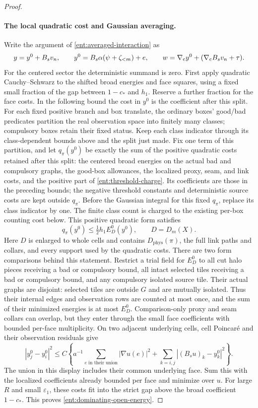 \begin{proof}
\paragraph{The local quadratic cost and Gaussian averaging.}
Write the argument of \eqref{ent:averaged-interaction} as
\[
 y=y^0+B_sv_n,\qquad
 y^0=B_s\alpha(\psi+\zeta_{<m})+e,\qquad
 w=\nabla_{\rm c}y^0+
                 (\nabla_{\rm c}B_sv_n+\tau).
\]
For the centered sector the deterministic summand is zero.
First apply quadratic Cauchy--Schwarz to the shifted broad energies
and face squares,
using a fixed small fraction of the gap between \(1-c_*\) and
\(h_1\).  Reserve a further fraction for the face costs.  In the
following bound the cost in \(y^0\) is the coefficient after this
split.
For each fixed positive branch and box translate, the ordinary boxes'
good/bad predicates partition the real observation space into finitely
many classes; compulsory boxes retain their fixed status.  Keep each
class indicator through its class-dependent bounds above and the split
just made.  Fix one term of this partition, and let \(q_\pi(y^0)\) be exactly the sum of the
positive quadratic costs retained after this split: the centered
broad energies on the actual bad and compulsory graphs, the
good-box allowances, the localized proxy, seam, and link costs, and
the positive part of \eqref{ent:threshold-charge}.  Its coefficients
are those in the preceding bounds; the negative threshold constants
and deterministic source costs are kept outside \(q_\pi\).  Before the
Gaussian integral for this fixed \(q_\pi\), replace its class indicator
by one.  The finite class count is charged to the existing per-box
counting cost below.  This positive quadratic form satisfies
\begin{equation}\label{ent:dominating-open-energy}
             q_\pi(y^0)\le\tfrac12 h_1 E_D^0(y^0),
                  \qquad D=D_m(X).
\end{equation}
Here \(D\) is enlarged to whole cells and contains
\(D_{\mathrm{phys}}(\pi)\), the full link paths and collars, and every
support used by the quadratic costs.  There are
two form comparisons behind this statement.  Restrict a
trial field for \(E_D^0\) to all cut halo pieces receiving a bad or
compulsory bound, all intact selected tiles receiving a bad or
compulsory bound, and any compulsory isolated source tile.
Their actual graphs are disjoint: selected tiles are outside \(G\)
and are mutually isolated.  Thus their internal edges and observation
rows are counted at most once, and the sum of their minimized
energies is at most \(E_D^0\).  Comparison-only proxy and seam collars
can overlap, but they enter through the small face coefficients with
bounded per-face multiplicity.  On two adjacent underlying
cells, cell Poincar\'e and their observation residuals give
\[
 |y_j^0-y_i^0|^2\le C\left\{
   a^{-1}\sum_{e\text{ in their union}}|\nabla u(e)|^2
       +\sum_{k=i,j}|(B_su)_k-y_k^0|^2\right\}.
\]
The union in this display includes their common underlying face.
Sum this with the localized coefficients already bounded
per face and minimize over \(u\).  For large \(R\) and
small \(\varepsilon_1\), these costs fit into the strict
gap above the broad coefficient \(1-c_*\).  This proves
\eqref{ent:dominating-open-energy}.


\end{proof}
